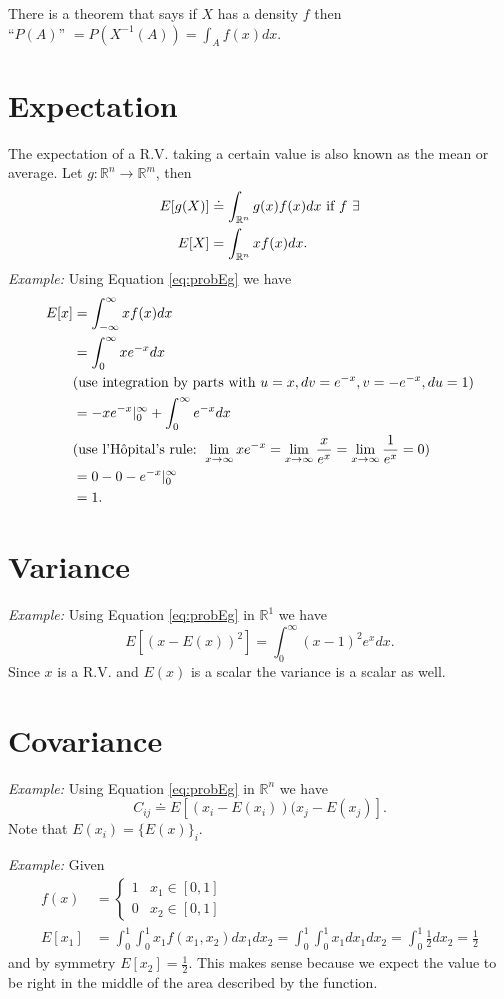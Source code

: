\documentclass[lecture,12pt,]{pcms-l}
\begin{document}
There is a theorem that says if $X$ has a density $f$ then \\
``$P(A)$'' $= P\left(X^{-1}(A)\right) = \int_A f(x)dx$.

\section{Expectation}
The expectation of a R.V. taking a certain value is also known as the mean or average. Let $g: \mathbb{R}^n \to \mathbb{R}^m$, then
\begin{align*}
E[g(X)] &\doteq \int_{\mathbb{R}^n} g(x)f(x)dx \textnormal{ if } f ~ \exists \\
E[X] &= \int_{\mathbb{R}^n}xf(x)dx.
\end{align*}
\textit{Example:} Using Equation \ref{eq:probEg} we have
\begin{align*}
E[x] &= \int_{-\infty}^\infty xf(x)dx \\
&= \int_0^\infty xe^{-x}dx \\
&(\textnormal{use integration by parts with } u = x, dv = e^{-x}, v = -e^{-x}, du = 1) \\
&= -xe^{-x}\rvert_0^\infty + \int_0^\infty e^{-x}dx \\
&(\textnormal{use l'H\^opital's rule: } \lim_{x \to \infty} xe^{-x} = \lim_{x \to \infty} \frac{x}{e^x} = \lim_{x \to \infty} \frac{1}{e^x} = 0) \\
&= 0 - 0 - e^{-x}\rvert_0^\infty \\
&= 1.
\end{align*}

\section{Variance}
\textit{Example:} Using Equation \ref{eq:probEg} in $\mathbb{R}^1$ we have
$$E[(x - E(x))^2] = \int_0^\infty (x-1)^2e^xdx.$$
Since $x$ is a R.V. and $E(x)$ is a scalar the variance is a scalar as well.

\section{Covariance}
\textit{Example:} Using Equation \ref{eq:probEg} in $\mathbb{R}^n$ we have $$C_{ij} \doteq E[(x_i - E(x_i))(x_j - E(x_j)].$$ Note that $E(x_i) = \lbrace E(x) \rbrace_i$.

\textit{Example:} Given
\begin{align*}
f(x) &= \begin{cases} 1 & x_1 \in [0,1] \\ 0 & x_2 \in [0,1] \end{cases} \\
E[x_1] &= \int_0^1 \int_0^1 x_1f(x_1,x_2)dx_1dx_2 = \int_0^1 \int_0^1 x_1dx_1dx_2 = \int_0^1 \frac{1}{2}dx_2 = \frac{1}{2}
\end{align*}
and by symmetry $E[x_2] = \frac{1}{2}$. This makes sense because we expect the value to be right in the middle of the area described by the function.
\end{document}
